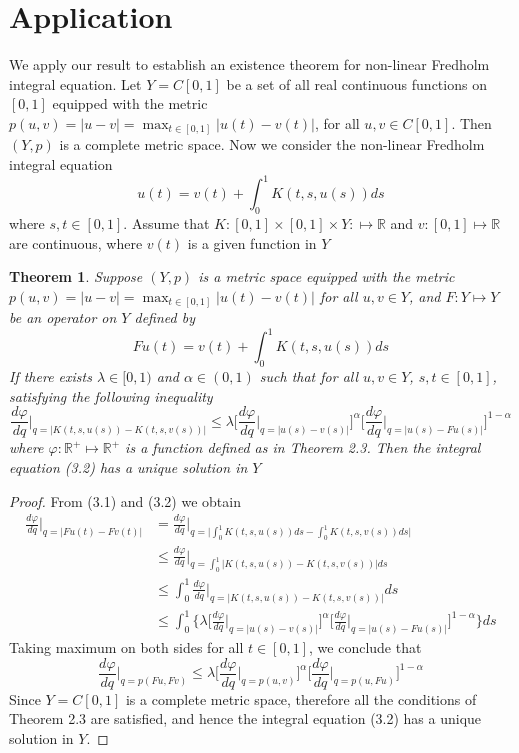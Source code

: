 \documentclass[11pt,letterpaper]{article}
\newtheorem{thm}{Theorem}[section]
\begin{document}
\section{\textbf{Application}}

\noindent We apply our result to establish an existence theorem for non-linear  Fredholm integral equation. Let $Y=C[0,1]$ be a set of all real continuous functions on $[0,1]$ equipped with the metric $p(u,v)=\vert u-v\vert=\max_{t\in [0,1]} \vert u(t)-v(t)\vert$, for all $u,v\in C[0,1]$. Then $(Y,p)$ is a complete metric space. Now we consider the non-linear Fredholm integral equation
\begin{equation}
\tag{3.1}
u(t)=v(t)+\int_{0}^{1} K(t,s, u(s)) ds
\end{equation}
where $s,t\in [0,1]$. Assume that $K:[0,1]\times [0,1]\times Y: \mapsto \mathbb{R}$ and $v:[0,1]\mapsto \mathbb{R}$ are continuous, where $v(t)$ is a given function in $Y$

\begin{thm} Suppose $(Y,p)$ is a metric space equipped with the metric $p(u,v)=\vert u-v\vert=\max_{t\in[0,1]} \vert u(t)-v(t)\vert$ for all $u,v\in Y$, and $F:Y\mapsto Y$ be an operator on $Y$ defined by
\begin{equation}
\tag{3.2}
Fu(t)=v(t)+\int_{0}^{1} K(t,s,u(s)) ds
\end{equation}
If there exists $\lambda \in [0,1)$ and $\alpha \in (0,1)$ such that for all $u,v\in Y$, $s,t\in [0,1]$, satisfying the following inequality
$$\frac{d\varphi}{dq}\bigg|_{q=\vert K(t,s,u(s))-K(t,s,v(s))\vert} \leq \lambda \bigg[\frac{d\varphi}{dq}\bigg|_{q=\vert u(s)-v(s)\vert}\bigg]^{\alpha} \bigg[\frac{d\varphi}{dq}\bigg|_{q=\vert u(s)-Fu(s)\vert}\bigg]^{1-\alpha}$$ where $\varphi:\mathbb{R}^{+}\mapsto \mathbb{R}^{+}$ is a function defined as in Theorem 2.3. Then the integral equation (3.2) has a unique solution in $Y$
\end{thm}

\begin{proof} From (3.1) and (3.2) we obtain
\begin{align*}
\frac{d\varphi}{dq}\bigg|_{q=\vert Fu(t)-Fv(t)\vert} &=\frac{d\varphi}{dq}\bigg|_{q=\bigg\vert \int_{0}^{1} K(t,s,u(s)) ds-\int_{0}^{1} K(t,s,v(s))ds \bigg\vert} \\
&\leq \frac{d\varphi}{dq}\bigg|_{q=\int_{0}^{1} \vert K(t,s,u(s))-K(t,s,v(s))\vert ds} \\
&\leq \int_{0}^{1} \frac{d\varphi}{dq}\bigg|_{q=\vert K(t,s,u(s))-K(t,s,v(s))\vert} ds\\
&\leq \int_{0}^{1} \bigg\{\lambda \bigg[\frac{d\varphi}{dq}\bigg|_{q=\vert u(s)-v(s)\vert}\bigg]^{\alpha} \bigg[\frac{d\varphi}{dq}\bigg|_{q=\vert u(s)-Fu(s)\vert}\bigg]^{1-\alpha} \bigg\} ds
\end{align*}
\noindent Taking maximum on both sides for all $t\in [0,1]$, we conclude that
$$\frac{d\varphi}{dq}\bigg|_{q=p(Fu,Fv)} \leq \lambda \bigg[\frac{d\varphi}{dq}\bigg|_{q=p(u,v)}\bigg]^{\alpha} \bigg[\frac{d\varphi}{dq}\bigg|_{q=p(u,Fu)}\bigg]^{1-\alpha} $$
Since $Y=C[0,1]$ is a complete metric space, therefore all the conditions of Theorem 2.3 are satisfied, and hence the integral equation (3.2) has a unique solution in $Y$.
\end{proof}
\end{document}
